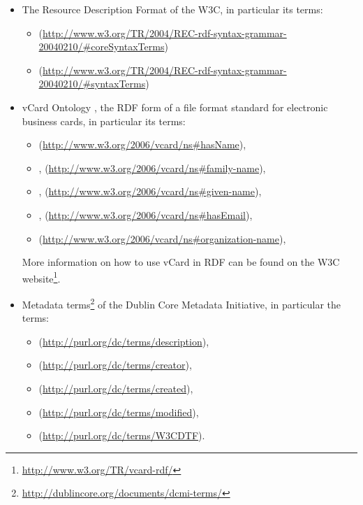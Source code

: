 \begin{itemize}
	\item  {
	
     The Resource Description Format \citep{RDF} of the W3C, in particular its terms:
     \begin{itemize}
		\item {} (\url{http://www.w3.org/TR/2004/REC-rdf-syntax-grammar-20040210/#coreSyntaxTerms})
		\item {} (\url{http://www.w3.org/TR/2004/REC-rdf-syntax-grammar-20040210/#syntaxTerms})
	\end{itemize}
	}
	\item  {

	vCard Ontology \citep{vCardOnto}, the RDF form of a file format standard for electronic business 
    cards, in particular its terms:
    	\begin{itemize}
		\item {} (\url{http://www.w3.org/2006/vcard/ns#hasName}), 
		\item {}, (\url{http://www.w3.org/2006/vcard/ns#family-name}),
		\item {}, (\url{http://www.w3.org/2006/vcard/ns#given-name}),
		\item {}, (\url{http://www.w3.org/2006/vcard/ns#hasEmail}),
		\item {} (\url{http://www.w3.org/2006/vcard/ns#organization-name}),
	\end{itemize}

	More information on how to use vCard in RDF can be found 
    on the W3C website\footnote{\url{http://www.w3.org/TR/vcard-rdf/}}.
	
	}
	\item {
	
	Metadata terms\footnote{\url{http://dublincore.org/documents/dcmi-terms/}} of 
	the Dublin Core Metadata Initiative, in particular the terms: 

	\begin{itemize}
		\item {} (\url{http://purl.org/dc/terms/description}),
		\item {} (\url{http://purl.org/dc/terms/creator}), 
		\item {} (\url{http://purl.org/dc/terms/created}), 
		\item {} (\url{http://purl.org/dc/terms/modified}),
		\item {} (\url{http://purl.org/dc/terms/W3CDTF}).
	\end{itemize}
		
}
\end{itemize}
